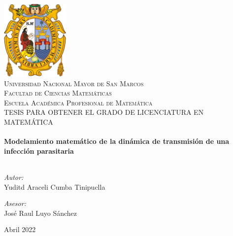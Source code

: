 \begin{titlepage}
\vbox{ }

\vbox{ }

\begin{center}
\includegraphics[width=0.25\textwidth]{img/logoUNMSM.jpg}\\[1cm]
\textsc{\LARGE Universidad Nacional Mayor de San Marcos}\\[1.5cm]
\textsc{\LARGE Facultad de Ciencias Matemáticas}\\[0.5cm]
\textsc{\LARGE Escuela Académica Profesional de Matemática}\\[1.5cm]
\textsc{\Large TESIS PARA OBTENER EL GRADO DE LICENCIATURA EN MATEMÁTICA}\\[0.5cm]

\vbox{ }
\HRule \\[0.4cm]
{ \huge \bfseries Modelamiento matem\'atico de la din\'amica de transmisi\'on de una infecci\'on parasitaria}\\[0.4cm]
\HRule \\[1.5cm]
\begin{minipage}{0.4\textwidth}
\begin{flushleft} \large
\emph{Autor: }\\
Yuditd Araceli Cumba Tinipuclla
\end{flushleft}
\end{minipage}
\begin{minipage}{0.4\textwidth}
\begin{flushright} \large
\emph{Asesor:} \\
José Raul Luyo Sánchez
\end{flushright}
\end{minipage}
\vfill
{\large Abril 2022}
\end{center}
\end{titlepage}